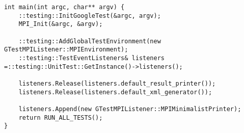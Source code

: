 \documentclass{report}
\begin{document}
\begin{lstlisting}
int main(int argc, char** argv) {
    ::testing::InitGoogleTest(&argc, argv);
    MPI_Init(&argc, &argv);

    ::testing::AddGlobalTestEnvironment(new GTestMPIListener::MPIEnvironment);
    ::testing::TestEventListeners& listeners =::testing::UnitTest::GetInstance()->listeners();

    listeners.Release(listeners.default_result_printer());
    listeners.Release(listeners.default_xml_generator());

    listeners.Append(new GTestMPIListener::MPIMinimalistPrinter);
    return RUN_ALL_TESTS();
}
	\end{lstlisting}
\end{document}
